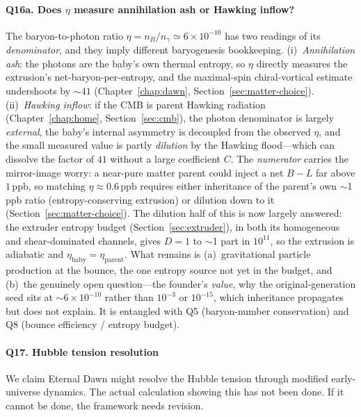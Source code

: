 \paragraph{Q16a. Does $\eta$ measure annihilation ash or Hawking inflow?}
\label{q:eta-denominator}
The baryon-to-photon ratio $\eta=n_B/n_\gamma\simeq6\times10^{-10}$ has two
readings of its \emph{denominator}, and they imply different baryogenesis
bookkeeping. (i)~\emph{Annihilation ash}: the photons are the baby's own thermal
entropy, so $\eta$ directly measures the extrusion's net-baryon-per-entropy, and
the maximal-spin chiral-vortical estimate undershoots by $\sim41$
(Chapter~\ref{chap:dawn}, Section~\ref{sec:matter-choice}). (ii)~\emph{Hawking
inflow}: if the CMB is parent Hawking radiation
(Chapter~\ref{chap:home}, Section~\ref{sec:cmb}), the photon
denominator is largely \emph{external}, the baby's internal asymmetry is decoupled
from the observed $\eta$, and the small measured value is partly \emph{dilution} by
the Hawking flood---which can dissolve the factor of $41$ without a large
coefficient $C$. The \emph{numerator} carries the mirror-image worry: a near-pure
matter parent could inject a net $B{-}L$ far above $1\,\mathrm{ppb}$, so matching
$\eta\approx0.6\,\mathrm{ppb}$ requires either inheritance of the parent's own
$\sim$1\,ppb ratio (entropy-conserving extrusion) or dilution down to it
(Section~\ref{sec:matter-choice}). The dilution half of this is now largely answered:
the extruder entropy budget (Section~\ref{sec:extruder}), in both its homogeneous
and shear-dominated channels, gives $D=1$ to $\sim$1 part in $10^{11}$, so the
extrusion is adiabatic and $\eta_{\mathrm{baby}}=\eta_{\mathrm{parent}}$. What
remains is (a)~gravitational particle production at the bounce, the one entropy
source not yet in the budget, and (b)~the genuinely open question---the founder's
\emph{value}, why the original-generation seed sits at $\sim6\times10^{-10}$
rather than $10^{-3}$ or $10^{-15}$, which inheritance propagates but does not
explain. It is entangled with Q5 (baryon-number conservation) and Q8 (bounce
efficiency / entropy budget).

\paragraph{Q17. Hubble tension resolution}
We claim Eternal Dawn might resolve the Hubble tension through modified early-universe
dynamics. The actual calculation showing this has not been done. If it cannot be
done, the framework needs revision.

